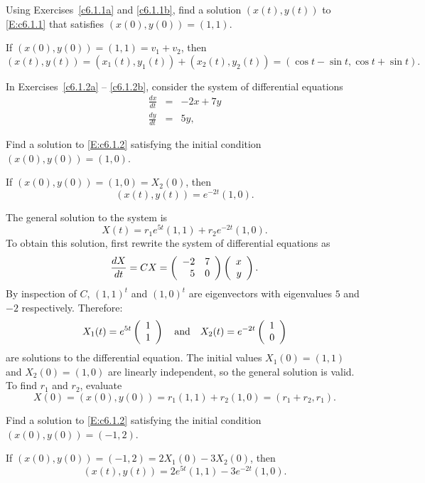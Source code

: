 \documentclass{ximera}
\begin{document}
\begin{exercise} \label{c6.1.1d}
Using Exercises~\ref{c6.1.1a} and \ref{c6.1.1b}, find a solution $(x(t),y(t))$
to \eqref{E:c6.1.1} that satisfies $(x(0),y(0)) = (1,1)$.

\begin{solution}

If $(x(0),y(0)) = (1,1) = v_1 + v_2$, then
\[
(x(t),y(t)) = (x_1(t),y_1(t)) + (x_2(t),y_2(t)) =
(\cos t - \sin t, \cos t + \sin t).
\]

\end{solution}
\end{exercise}

\noindent In Exercises~\ref{c6.1.2a} -- \ref{c6.1.2b}, consider the system of
differential equations
\begin{equation}  \label{E:c6.1.2}
\begin{array}{rcl}
\frac{dx}{dt} & = & -2x+7y \\
\frac{dy}{dt} & = &  5y,
\end{array}
\end{equation}
\begin{exercise} \label{c6.1.2a}
Find a solution to \eqref{E:c6.1.2}
satisfying the initial condition $(x(0),y(0)) = (1,0)$.

\begin{solution}

\ans If $(x(0),y(0)) = (1,0) = X_2(0)$, then
\[
(x(t),y(t)) = e^{-2t}(1,0).
\]

\soln The general solution to the system is
\[
X(t) = r_1e^{5t}(1,1) + r_2e^{-2t}(1,0).
\]
To obtain this solution, first rewrite the system of differential
equations as
\[
\frac{dX}{dt} = CX = \left(\begin{array}{rr} -2 & 7\\ 5 &0\end{array}\right)\left(\begin{array}{r} x \\ y\end{array}\right).
\]
By inspection of $C$, $(1,1)^t$ and $(1,0)^t$ are eigenvectors with
eigenvalues $5$ and $-2$ respectively.  Therefore:
\[
X_1(t) = e^{5t}\left(\begin{array}{r} 1 \\ 1\end{array}\right) \quad\mbox{and}\quad X_2(t) = e^{-2t}\left(\begin{array}{r} 1 \\ 0\end{array}\right)
\]
are solutions to the differential equation.
The initial values $X_1(0) = (1,1)$ and $X_2(0) = (1,0)$ are linearly
independent, so the general solution is valid.
To find $r_1$ and $r_2$, evaluate
\[
X(0) = (x(0),y(0)) = r_1(1,1) + r_2(1,0) = (r_1 + r_2,r_1).
\]

\end{solution}
\end{exercise}
\begin{exercise} \label{c6.1.2b}
Find a solution to \eqref{E:c6.1.2}
satisfying the initial condition $(x(0),y(0)) = (-1,2)$.

\begin{solution}
If $(x(0),y(0)) = (-1,2) = 2X_1(0) - 3X_2(0)$, then
\[
(x(t),y(t)) = 2e^{5t}(1,1) - 3e^{-2t}(1,0).
\]

\end{solution}
\end{exercise}
\end{document}
